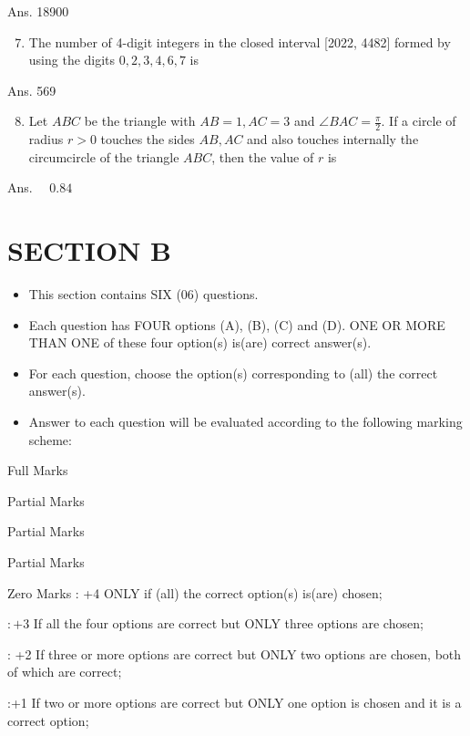 \documentclass[10pt]{article}
\begin{document}
Ans. 18900

\begin{enumerate}
  \setcounter{enumi}{6}
  \item The number of 4-digit integers in the closed interval [2022, 4482] formed by using the digits $0,2,3,4,6,7$ is
\end{enumerate}

Ans. 569

\begin{enumerate}
  \setcounter{enumi}{7}
  \item Let $A B C$ be the triangle with $A B=1, A C=3$ and $\angle B A C=\frac{\pi}{2}$. If a circle of radius $r>0$ touches the sides $A B, A C$ and also touches internally the circumcircle of the triangle $A B C$, then the value of $r$ is
\end{enumerate}

Ans. $\quad 0.84$

\section{SECTION B}
\begin{itemize}
  \item This section contains SIX (06) questions.

  \item Each question has FOUR options (A), (B), (C) and (D). ONE OR MORE THAN ONE of these four option(s) is(are) correct answer(s).

  \item For each question, choose the option(s) corresponding to (all) the correct answer(s).

  \item Answer to each question will be evaluated according to the following marking scheme:

\end{itemize}

Full Marks

Partial Marks

Partial Marks

Partial Marks

Zero Marks : +4 ONLY if (all) the correct option(s) is(are) chosen;

$:+3$ If all the four options are correct but ONLY three options are chosen;

: +2 If three or more options are correct but ONLY two options are chosen, both of which are correct;

:+1 If two or more options are correct but ONLY one option is chosen and it is a correct option;
\end{document}
